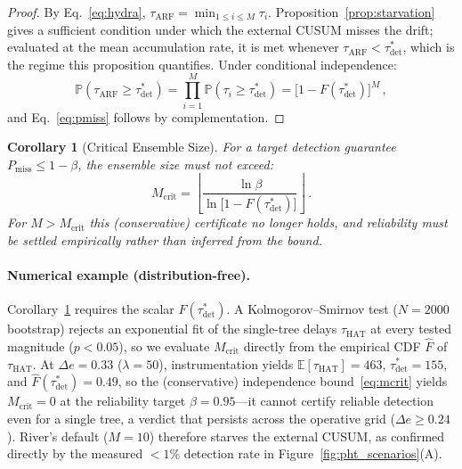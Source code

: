 \documentclass[10pt,conference]{IEEEtran}
\newtheorem{corollary}[theorem]{Corollary}
\theoremstyle{definition}
\begin{document}
\begin{proof}
  By Eq.~\eqref{eq:hydra}, $\tau_{\mathrm{ARF}} = \min_{1 \le i \le M} \tau_i$.
  Proposition~\ref{prop:starvation} gives a sufficient condition under which the external CUSUM misses the drift; evaluated at the mean accumulation rate, it is met whenever $\tau_{\mathrm{ARF}} < \tau_{\mathrm{det}}^*$, which is the regime this proposition quantifies.
  Under conditional independence:
  \[
    \mathbb{P}\!\left(\tau_{\mathrm{ARF}} \ge \tau_{\mathrm{det}}^*\right) = \prod_{i=1}^{M} \mathbb{P}\!\left(\tau_i \ge \tau_{\mathrm{det}}^*\right) = \bigl[1 - F(\tau_{\mathrm{det}}^*)\bigr]^M\,,
  \]
  and Eq.~\eqref{eq:pmiss} follows by complementation.
\end{proof}

\begin{corollary}[Critical Ensemble Size]\label{cor:mcrit}
  For a target detection guarantee $P_{\mathrm{miss}} \le 1 - \beta$, the ensemble size must not exceed:
  \begin{equation}\label{eq:mcrit}
    M_{\mathrm{crit}} = \left\lfloor \frac{\ln \beta}{\ln\!\bigl[1 - F(\tau_{\mathrm{det}}^*)\bigr]} \right\rfloor\,.
  \end{equation}
  For $M > M_{\mathrm{crit}}$ this (conservative) certificate no longer holds, and reliability must be settled empirically rather than inferred from the bound.
\end{corollary}

\paragraph{Numerical example (distribution-free).}
Corollary~\ref{cor:mcrit} requires the scalar $F(\tau_{\mathrm{det}}^*)$. A Kolmogorov--Smirnov test ($N{=}2000$ bootstrap) rejects an exponential fit of the single-tree delays $\tau_{\mathrm{HAT}}$ at every tested magnitude ($p<0.05$), so we evaluate $M_{\mathrm{crit}}$ directly from the empirical CDF $\widehat{F}$ of $\tau_{\mathrm{HAT}}$.
At $\Delta e = 0.33$ ($\lambda=50$), instrumentation yields $\mathbb{E}[\tau_{\mathrm{HAT}}] = 463$, $\tau_{\mathrm{det}}^* = 155$, and $\widehat{F}(\tau_{\mathrm{det}}^*) = 0.49$, so the (conservative) independence bound~\eqref{eq:mcrit} yields $M_{\mathrm{crit}} = 0$ at the reliability target $\beta = 0.95$---it cannot certify reliable detection even for a single tree, a verdict that persists across the operative grid ($\Delta e \ge 0.24$).
River's default ($M=10$) therefore starves the external CUSUM, as confirmed directly by the measured ${<}1\%$ detection rate in Figure~\ref{fig:pht_scenarios}(A).
\end{document}
